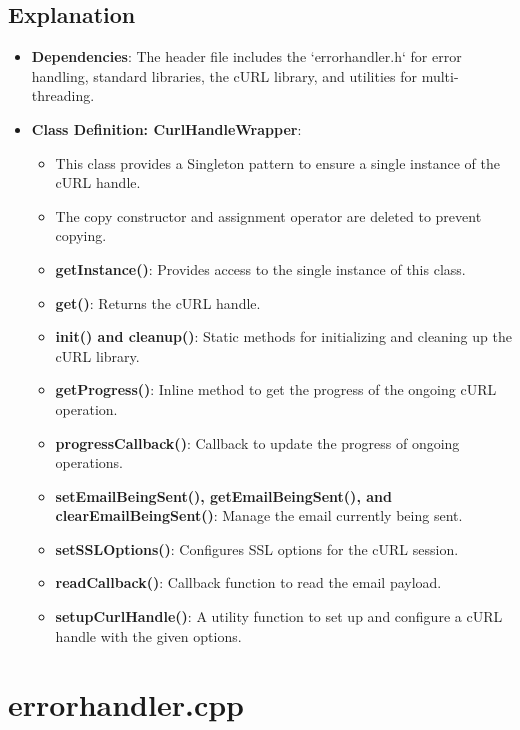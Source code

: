 \documentclass{article}
\begin{document}
	\subsection*{Explanation}
	\begin{itemize}
		\item \textbf{Dependencies}: The header file includes the `errorhandler.h` for error handling, standard libraries, the cURL library, and utilities for multi-threading.
		
		\item \textbf{Class Definition: CurlHandleWrapper}:
		\begin{itemize}
			\item This class provides a Singleton pattern to ensure a single instance of the cURL handle.
			\item The copy constructor and assignment operator are deleted to prevent copying.
			\item \textbf{getInstance()}: Provides access to the single instance of this class.
			\item \textbf{get()}: Returns the cURL handle.
			\item \textbf{init() and cleanup()}: Static methods for initializing and cleaning up the cURL library.
			\item \textbf{getProgress()}: Inline method to get the progress of the ongoing cURL operation.
			\item \textbf{progressCallback()}: Callback to update the progress of ongoing operations.
			\item \textbf{setEmailBeingSent(), getEmailBeingSent(), and clearEmailBeingSent()}: Manage the email currently being sent.
			\item \textbf{setSSLOptions()}: Configures SSL options for the cURL session.
			\item \textbf{readCallback()}: Callback function to read the email payload.
			
		\item \textbf{setupCurlHandle()}: A utility function to set up and configure a cURL handle with the given options.
		\end{itemize}
		
		
	\end{itemize}
	
	
	\section{errorhandler.cpp}
	
\end{document}

